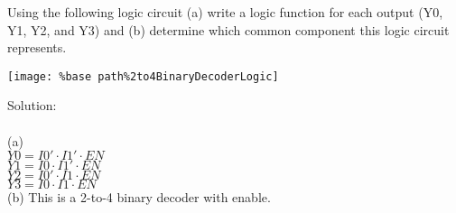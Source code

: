 Using the following logic circuit (a) write a logic function for each output (Y0, Y1, Y2, and Y3) and (b) determine which common component this logic circuit represents.\\
\begin{center}
  \texttt{[image: \%base path\%2to4BinaryDecoderLogic]} \\
\end{center}

Solution: \\ \\
(a)\\
$Y0 = I0' \cdot I1' \cdot EN$\\
$Y1 = I0 \cdot I1' \cdot EN$\\
$Y2 = I0' \cdot I1 \cdot EN$\\
$Y3 = I0 \cdot I1 \cdot EN$\\
(b) This is a 2-to-4 binary decoder with enable.\\ \\
